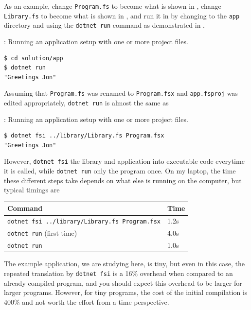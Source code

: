 \documentclass[fsharpNotes.tex]{subfiles}
\begin{document}
As an example, change \lstinline[language=console]{Program.fs} to become what is shown in ,
change \lstinline[language=console]{Library.fs} to become what is shown in , 
and run it in  by changing to the \lstinline[language=console]{app} directory and using the \lstinline[language=console]{dotnet run} command as demonstrated in .
\begin{codeNOutput}[label=dotnetRun,
  top=-5pt,
  bottom=-5pt,
  left=-2pt,
  right=-2pt,
]{: Running an application setup with one or more project files.}
  \begin{lstlisting}[language=console,escapechar=§]
$ cd solution/app
$ dotnet run
"Greetings Jon"
\end{lstlisting}%
\end{codeNOutput}
Assuming that \lstinline[language=console]{Program.fs} was renamed to \lstinline[language=console]{Program.fsx} and \lstinline[language=console]{app.fsproj} was edited appropriately, \lstinline[language=console]{dotnet run} is almost the same as
\begin{codeNOutput}[label=dotnetFsi,
  top=-5pt,
  bottom=-5pt,
  left=-2pt,
  right=-2pt,
]{: Running an application setup with one or more project files.}
  \begin{lstlisting}[language=console,escapechar=§]
$ dotnet fsi ../library/Library.fs Program.fsx
"Greetings Jon"
\end{lstlisting}%
\end{codeNOutput}
However, \lstinline[language=console]{dotnet fsi}  the library and application into executable code everytime it is called, while \lstinline[language=console]{dotnet run} only  the program once. On my laptop, the time these different steps take depends on what else is running on the computer, but typical timings are
\begin{center}
  \begin{tabular}{|l|l|}
    \hline
    \rowcolor{headerRowColor} Command & Time\\
    \hline
    \lstinline[language=console]|dotnet fsi ../library/Library.fs Program.fsx| & 1.2s\\
    \lstinline[language=console]|dotnet run| (first time) & 4.0s\\
    \lstinline[language=console]|dotnet run| & 1.0s\\
    \hline
\end{tabular}
\end{center}
The example application, we are studying here, is tiny, but even in this case, the repeated translation by \lstinline[language=console]{dotnet fsi} is a 16\% overhead when compared to an already compiled program, and you should expect this overhead to be larger for larger programs. However, for tiny programs, the cost of the initial compilation is 400\% and not worth the effort from a time perspective.
\end{document}
